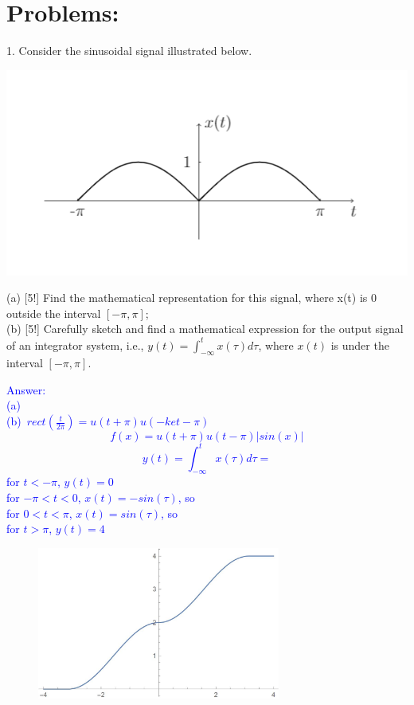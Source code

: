 \documentclass[12pt,a4paper]{article}
\begin{document}
\section*{Problems:}
\normalsize
\begin{tcolorbox}[colback = white]
1. Consider the sinusoidal signal illustrated below.\\
\begin{center}
\includegraphics[scale=0.65]{problem1.png}\\
\end{center}
(a) [5!] Find the mathematical representation for this signal, where x(t) is 0 outside the interval $[-\pi,\pi]$;\\
(b) [5!] Carefully sketch and find a mathematical expression for the output signal of an integrator system, i.e., $y(t)=\int_{-\infty}^{t}x(\tau)d\tau$, where $x(t)$ is under the interval $[-\pi,\pi]$.
\end{tcolorbox}

\begin{tcolorbox}
\normalsize
\textcolor{blue}{Answer:\\
(a) \\
(b)~$rect(\frac{t}{2\pi})=u(t+\pi)u(-ket-\pi)$\\
$$f(x)=u(t+\pi)u(t-\pi)|sin(x)|$$
$$y(t)=\int^t_{-\infty}x(\tau)d\tau=$$
for $t<-\pi$, $y(t)=0$\\
for $-\pi<t<0$, $x(t)=-sin(\tau)$, so \\
for $0<t<\pi$, $x(t)=sin(\tau)$, so \\
for $t>\pi$, $y(t)=4$
\begin{figure}[H]
    \centering
    \includegraphics[width=8cm]{1b.jpg}
\end{figure}
}
\end{tcolorbox}
\end{document}
